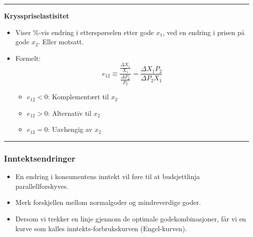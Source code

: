 \documentclass[
  letterpaper,
  DIV=11,
  numbers=noendperiod]{scrartcl}
\providecommand{\tightlist}{%
  \setlength{\itemsep}{0pt}\setlength{\parskip}{0pt}}\usepackage{longtable,booktabs,array}
\begin{document}
\begin{center}\rule{0.5\linewidth}{0.5pt}\end{center}

\textbf{Krysspriselastisitet}

\begin{itemize}
\tightlist
\item
  Viser \%-vis endring i etterspørselen etter gode \(x_1\), ved en
  endring i prisen på gode \(x_2\). Eller motsatt.
\item
  Formelt: \begin{equation*}
  e_{12} \equiv \frac{\frac{\Delta X_{1}}{X_{1}}}{\frac{\Delta P_{2}}{P_{2}}}=\frac{\Delta X_{1} P_{2} }{\Delta P_{2} X_{1}}
  \end{equation*}

  \begin{itemize}
  \tightlist
  \item
    \(e_{12} < 0\): Komplementært til \(x_2\)
  \item
    \(e_{12} > 0\): Alternativ til \(x_2\)
  \item
    \(e_{12} = 0\): Uavhengig av \(x_2\)
  \end{itemize}
\end{itemize}

\begin{center}\rule{0.5\linewidth}{0.5pt}\end{center}

\subsubsection{Inntektsendringer}\label{inntektsendringer}

\begin{itemize}
\tightlist
\item
  En endring i konsumentens inntekt vil føre til at budsjettlinja
  parallellforskyves.
\item
  Merk forskjellen mellom normalgoder og mindreverdige goder.
\item
  Dersom vi trekker en linje gjennom de optimale godekombinasjoner, får
  vi en kurve som kalles inntekts-forbrukskurven (Engel-kurven).
\end{itemize}
\end{document}
